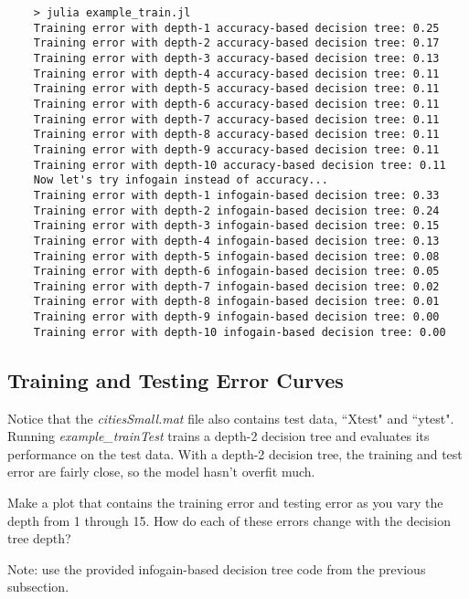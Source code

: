 \documentclass{article}
\def\blu#1{{\color{blu}#1}}
\begin{document}
\begin{lstlisting}
    > julia example_train.jl
    Training error with depth-1 accuracy-based decision tree: 0.25
    Training error with depth-2 accuracy-based decision tree: 0.17
    Training error with depth-3 accuracy-based decision tree: 0.13
    Training error with depth-4 accuracy-based decision tree: 0.11
    Training error with depth-5 accuracy-based decision tree: 0.11
    Training error with depth-6 accuracy-based decision tree: 0.11
    Training error with depth-7 accuracy-based decision tree: 0.11
    Training error with depth-8 accuracy-based decision tree: 0.11
    Training error with depth-9 accuracy-based decision tree: 0.11
    Training error with depth-10 accuracy-based decision tree: 0.11
    Now let's try infogain instead of accuracy...
    Training error with depth-1 infogain-based decision tree: 0.33
    Training error with depth-2 infogain-based decision tree: 0.24
    Training error with depth-3 infogain-based decision tree: 0.15
    Training error with depth-4 infogain-based decision tree: 0.13
    Training error with depth-5 infogain-based decision tree: 0.08
    Training error with depth-6 infogain-based decision tree: 0.05
    Training error with depth-7 infogain-based decision tree: 0.02
    Training error with depth-8 infogain-based decision tree: 0.01
    Training error with depth-9 infogain-based decision tree: 0.00
    Training error with depth-10 infogain-based decision tree: 0.00
\end{lstlisting}

\subsection{Training and Testing Error Curves}

Notice that the \emph{citiesSmall.mat} file also contains test data, ``Xtest" and ``ytest". 
Running \emph{example\_trainTest} trains a depth-2 decision tree and evaluates its performance on the test data. %
With a depth-2 decision tree, the training and test error are fairly close, so the model hasn't overfit much.


\blu{Make a plot that contains the training error and testing error as you vary the depth from 1 through 15. How do each of these errors change with the decision tree depth?}

Note: use the provided infogain-based decision tree code from the previous subsection.
\end{document}
